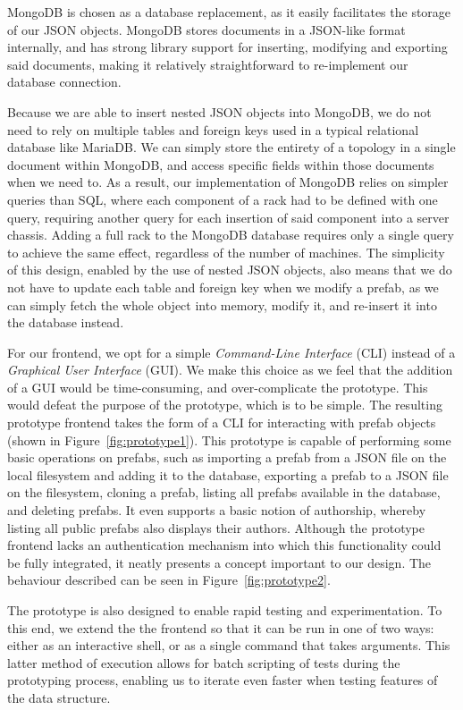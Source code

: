 \documentclass[11pt]{article}
\begin{document}
		MongoDB is chosen as a database replacement, as it easily facilitates the storage of our JSON objects.
		MongoDB stores documents in a JSON-like format internally, and has strong library support for inserting, modifying and exporting said documents, making it relatively straightforward to re-implement our database connection.

		Because we are able to insert nested JSON objects into MongoDB, we do not need to rely on multiple tables and foreign keys used in a typical relational database like MariaDB.
		We can simply store the entirety of a topology in a single document within MongoDB, and access specific fields within those documents when we need to.
		As a result, our implementation of MongoDB relies on simpler queries than SQL, where each component of a rack had to be defined with one query, requiring another query for each insertion of said component into a server chassis.
		Adding a full rack to the MongoDB database requires only a single query to achieve the same effect, regardless of the number of machines.
		The simplicity of this design, enabled by the use of nested JSON objects, also means that we do not have to update each table and foreign key when we modify a prefab, as we can simply fetch the whole object into memory, modify it, and re-insert it into the database instead.

		For our frontend, we opt for a simple \textit{Command-Line Interface} (CLI) instead of a \textit{Graphical User Interface} (GUI).
		We make this choice as we feel that the addition of a GUI would be time-consuming, and over-complicate the prototype. This would defeat the purpose of the prototype, which is to be simple.
		The resulting prototype frontend takes the form of a CLI for interacting with prefab objects (shown in Figure~\ref{fig:prototype1}).
		This prototype is capable of performing some basic operations on prefabs, such as importing a prefab from a JSON file on the local filesystem and adding it to the database, exporting a prefab to a JSON file on the filesystem, cloning a prefab, listing all prefabs available in the database, and deleting prefabs.
		It even supports a basic notion of authorship, whereby listing all public prefabs also displays their authors.
		Although the prototype frontend lacks an authentication mechanism into which this functionality could be fully integrated, it neatly presents a concept important to our design.
		The behaviour described can be seen in Figure~\ref{fig:prototype2}.

		The prototype is also designed to enable rapid testing and experimentation.
		To this end, we extend the the frontend so that it can be run in one of two ways: either as an interactive shell, or as a single command that takes arguments.
		This latter method of execution allows for batch scripting of tests during the prototyping process, enabling us to iterate even faster when testing features of the data structure.
\end{document}

